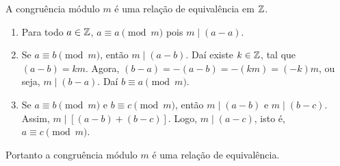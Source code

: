 \begin{proposicao}
    A congruência módulo $m$ é uma relação de equivalência em $\mathbb{Z}$.
\end{proposicao}
\begin{prova}
    \begin{enumerate}[label={\roman*})]
        \item Para todo $a \in \mathbb{Z}$, $a\equiv a\pmod{m}$ pois $m\mid (a-a)$.
        \item Se $a\equiv b\pmod{m}$, então $m\mid (a - b)$. Daí existe $k \in \mathbb{Z}$, tal que $(a - b) = km$. Agora, $(b - a) = -(a - b) = -(km) = (-k)m$, ou seja, $m \mid (b - a)$. Daí $b\equiv a \pmod{m}$.
        \item Se $a\equiv b\pmod{m}$ e $b\equiv c\pmod{m}$, então $m\mid (a-b)$ e $m\mid (b-c)$. Assim, $m\mid [(a-b)+(b-c)]$. Logo, $m\mid (a-c)$, isto é, $a\equiv c\pmod{m}$.
    \end{enumerate}

    Portanto a congruência módulo $m$ é uma relação de equivalência.
\end{prova}

